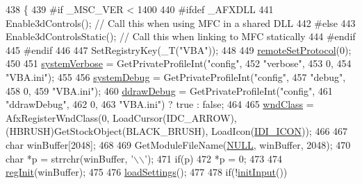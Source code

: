 \begin{DoxyCode}
438 \{
439 \textcolor{preprocessor}{#if \_MSC\_VER < 1400}
440 \textcolor{preprocessor}{#ifdef \_AFXDLL}
441   Enable3dControls();      \textcolor{comment}{// Call this when using MFC in a shared DLL}
442 \textcolor{preprocessor}{#else}
443   Enable3dControlsStatic();  \textcolor{comment}{// Call this when linking to MFC statically}
444 \textcolor{preprocessor}{#endif}
445 \textcolor{preprocessor}{#endif}
446 
447   SetRegistryKey(\_T(\textcolor{stringliteral}{"VBA"}));
448 
449   \mbox{\hyperlink{_v_b_a_8cpp_ae12004b9afc1b49d9f40d3efb5862c81}{remoteSetProtocol}}(0);
450 
451   \mbox{\hyperlink{_v_b_a_8cpp_a67739df6b2271a8b807f01c50a610478}{systemVerbose}} = GetPrivateProfileInt(\textcolor{stringliteral}{"config"},
452                                        \textcolor{stringliteral}{"verbose"},
453                                        0,
454                                        \textcolor{stringliteral}{"VBA.ini"});
455   
456   \mbox{\hyperlink{_v_b_a_8cpp_afa60dd2422feecb4839acdc9648ed783}{systemDebug}} = GetPrivateProfileInt(\textcolor{stringliteral}{"config"},
457                                      \textcolor{stringliteral}{"debug"},
458                                      0,
459                                      \textcolor{stringliteral}{"VBA.ini"});
460   \mbox{\hyperlink{class_v_b_a_a28d611a2c3dfc21191a27e8d8239de35}{ddrawDebug}} = GetPrivateProfileInt(\textcolor{stringliteral}{"config"},
461                                     \textcolor{stringliteral}{"ddrawDebug"},
462                                     0,
463                                     \textcolor{stringliteral}{"VBA.ini"}) ? true : \textcolor{keyword}{false};
464 
465   \mbox{\hyperlink{class_v_b_a_acd3b584c09c85ec31168b1f7d1d8505e}{wndClass}} = AfxRegisterWndClass(0, LoadCursor(IDC\_ARROW), (HBRUSH)GetStockObject(BLACK\_BRUSH), 
      LoadIcon(\mbox{\hyperlink{resource2_8h_a8b58cab14806de7fb85b9da0998d9b45}{IDI\_ICON}}));
466   
467   \textcolor{keywordtype}{char} winBuffer[2048];
468 
469   GetModuleFileName(\mbox{\hyperlink{getopt1_8c_a070d2ce7b6bb7e5c05602aa8c308d0c4}{NULL}}, winBuffer, 2048);
470   \textcolor{keywordtype}{char} *p = strrchr(winBuffer, \textcolor{charliteral}{'\(\backslash\)\(\backslash\)'});
471   \textcolor{keywordflow}{if}(p)
472     *p = 0;
473   
474   \mbox{\hyperlink{_reg_8cpp_a4ac70c76e14c1b94cdfa21703918d2a2}{regInit}}(winBuffer);
475 
476   \mbox{\hyperlink{class_v_b_a_aed48a7db8cc5b65a1e495661f6040915}{loadSettings}}();
477 
478   \textcolor{keywordflow}{if}(!\mbox{\hyperlink{class_v_b_a_ac19c75e259950ddd9bb5e97d73203ebb}{initInput}}())

\end{DoxyCode}
